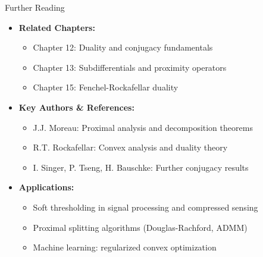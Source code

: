 \documentclass[aspectratio=169,10pt]{beamer}
\begin{document}
\begin{frame}{Further Reading}
  \vspace{-0.3cm}

  \begin{itemize}
    \item \textbf{Related Chapters:}
      \begin{itemize}
        \item Chapter 12: Duality and conjugacy fundamentals
        \item Chapter 13: Subdifferentials and proximity operators
        \item Chapter 15: Fenchel-Rockafellar duality
      \end{itemize}

    \item \textbf{Key Authors \& References:}
      \begin{itemize}
        \item J.J. Moreau: Proximal analysis and decomposition theorems
        \item R.T. Rockafellar: Convex analysis and duality theory
        \item I. Singer, P. Tseng, H. Bauschke: Further conjugacy results
      \end{itemize}

    \item \textbf{Applications:}
      \begin{itemize}
        \item Soft thresholding in signal processing and compressed sensing
        \item Proximal splitting algorithms (Douglas-Rachford, ADMM)
        \item Machine learning: regularized convex optimization
      \end{itemize}
  \end{itemize}
\end{frame}
\end{document}

